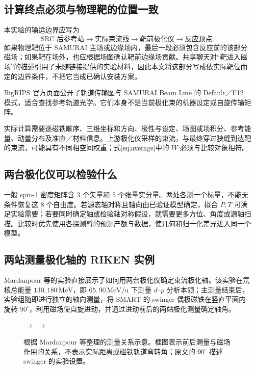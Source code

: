 \documentclass[UTF8,11pt,a4paper,fontset=none]{ctexart}
\newcommand{\unit}[1]{\,\mathrm{#1}}
\newcommand{\src}[2]{\cite[#2]{#1}}
\begin{document}
\subsection{计算终点必须与物理靶的位置一致}
本实验的输运边界应写为
\begin{equation*}
\text{SRC 后参考站}\to\text{实际束流线}\to\text{靶前极化仪}
\to\boxed{\text{反应顶点}}.
\end{equation*}
如果物理靶位于 SAMURAI 主场或边缘场内，最后一段必须包含反应前的该部分磁场；如果靶在场外，也应根据场图确认靶前边缘场贡献。共享聊天对“靶进入磁场”的描述引用了未随链接提供的实验材料，因此本文将这部分写成依实际靶位而定的边界条件，不把它当成已确认安装方案。

BigRIPS 官方页面公开了轨道传输图与 SAMURAI Beam Line 的 Default／F12 模式，适合查找参考轨道光学。它们本身不是当前极化束的机器设定或自旋传输矩阵。\src{BigRIPSOptics}{网页 COSY transfer map、Ray plots 的 SAMURAI Beam Line 项}

实际计算需要逐磁铁顺序、三维坐标和方向、极性与设定、场图或场积分、参考能量、动量分布及准直／材料信息。上游极化仪采样的束流，与最终穿过狭缝到达靶的束流，可能具有不同相空间权重；式\eqref{eq:average}中的 $W$ 必须与比较对象相符。

\subsection{两台极化仪可以检验什么}
一般 spin-1 密度矩阵含 3 个矢量和 5 个张量实分量。两处各测一个标量，不能无条件恢复这 8 个自由度。若源态轴对称且轴向由已验证模型确定，拟合 $P,T$ 可满足实验需要；若要同时确定轴或检验轴对称假设，就需要更多方位、角度或源轴扫描。比较时优先使用各探测臂的预测产额与数据，使几何和归一化差异进入同一个模型。

\clearpage
\subsection{两站测量极化轴的 RIKEN 实例}
Mardanpour 等的实验直接展示了如何用两台极化仪确定束流极化轴。该实验在氘核总能量 $130,180\unit{MeV}$，即 $65,90\unit{MeV/u}$ 下测量 $d$--$p$ 分析本领；主测量结束后，实验组随即进行独立的轴向测量，将 SMART 的 swinger 偶极磁铁在竖直平面内旋转 $90^\circ$，利用磁场使自旋进动，并通过进动前后的两站极化测量确定轴角。\src{Mardanpour2007}{arXiv v2 PDF 2、5，第 2 节}

\begin{figure}[H]\centering\small
{}
\quad$\longrightarrow$\quad
{}
\quad$\longrightarrow$\quad
{}
\caption{根据 Mardanpour 等\cite{Mardanpour2007}整理的测量关系示意。框图表示前后测量与磁场作用的关系，不表示实际距离或磁铁轨道弯转角；原文的 $90^\circ$ 描述 swinger 的实验设置。}
\label{fig:axis-check}
\end{figure}
\end{document}
